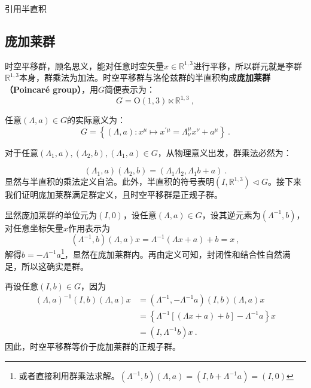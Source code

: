 

\begin{issues}
\issueTODO 引用半直积
\end{issues}


\subsection{庞加莱群}
时空平移群，顾名思义，能对任意时空矢量$x\in \mathbb R^{1,3} $进行平移，所以群元就是李群$\mathbb R^{1,3}$本身，群乘法为加法。时空平移群与洛伦兹群的半直积构成\textbf{庞加莱群（Poincaré group）}，用$G$简便表示为：
\begin{equation}
G= \mathrm{O}(1,3) \ltimes\mathbb{R}^{1,3}~,
\end{equation}

任意$(\Lambda,a)\in G$的实际意义为：
\begin{equation}\label{eq_PoinGr_3}
G=\left\{(\Lambda, a): x^{\mu} \mapsto x^{\prime \mu}=\Lambda_{\nu}^{\mu} x^{\nu}+a^{\mu}\right\}~.
\end{equation}


对于任意$(\Lambda_1,a),(\Lambda_2,b),(\Lambda_1,a)\in G$，从物理意义出发，群乘法必然为：

\begin{equation}
(\Lambda_1,a)(\Lambda_2,b)=(\Lambda_1\Lambda_2,\Lambda_1b+a)~.
\end{equation}
显然与半直积的乘法定义自洽。此外，半直积的符号表明$(I,\mathbb R^{1,3})\vartriangleleft G$。接下来我们证明庞加莱群满足群定义，且时空平移群是正规子群。

显然庞加莱群的单位元为$(I,0)$，设任意$(\Lambda,a)\in G$，设其逆元素为$(\Lambda^{-1},b)$，对任意坐标矢量$x$作用表示为
\begin{equation}
(\Lambda^{-1},b)(\Lambda,a)x=\Lambda^{-1}(\Lambda x+a)+b=x~,
\end{equation}
解得$b=-\Lambda^{-1} a$\footnote{或者直接利用群乘法求解。$(\Lambda^{-1},b)(\Lambda,a)=(I,b+\Lambda^{-1}a)=(I,0)$}，显然在庞加莱群内。再由定义可知，封闭性和结合性自然满足，所以这确实是群。

再设任意$(I,b)\in G$，因为
\begin{equation}
\begin{aligned}
(\Lambda,a)^{-1}(I,b)(\Lambda,a)x&=(\Lambda^{-1},-\Lambda^{-1}a)(I,b)(\Lambda,a)x\\
&=\left\{\Lambda^{-1}\left [\left(\Lambda x+a \right)+b\right]-\Lambda^{-1}a\right\}x\\
&=(I,\Lambda^{-1}b)x~.
\end{aligned}
\end{equation}
因此，时空平移群等价于庞加莱群的正规子群。

